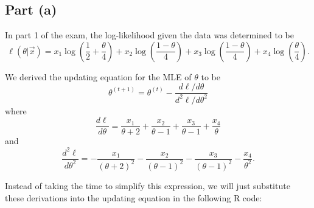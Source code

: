 \documentclass[
]{article}
\begin{document}

\hypertarget{part-a-1}{%
\subsection{Part (a)}\label{part-a-1}}


In part 1 of the exam, the log-likelihood given the data was determined
to be \[
  \ell(\theta | \vec{x}) = x_1 \log\left(\frac{1}{2}+\frac{\theta}{4}\right) + x_2 \log\left(\frac{1-\theta}{4}\right) + x_3 \log\left(\frac{1-\theta}{4}\right) + x_4 \log\left(\frac{\theta}{4}\right).
\]

We derived the updating equation for the MLE of \(\theta\) to be \[
  \theta^{(t+1)} = \theta^{(t)} - \frac{d \ell / d \theta}{d^2 \ell / d \theta^2}
\] where \[
  \frac{d \ell}{d \theta} = \frac{x_1}{\theta+2} + \frac{x_2}{\theta-1} + \frac{x_3}{\theta-1} + \frac{x_4}{\theta}
\] and \[
  \frac{d^2 \ell}{d \theta^2} = -\frac{x_1}{(\theta+2)^2} - \frac{x_2}{(\theta-1)^2} - \frac{x_3}{(\theta-1)^2} - \frac{x_4}{\theta^2}.
\]

Instead of taking the time to simplify this expression, we will just
substitute these derivations into the updating equation in the following
R code:
\end{document}
